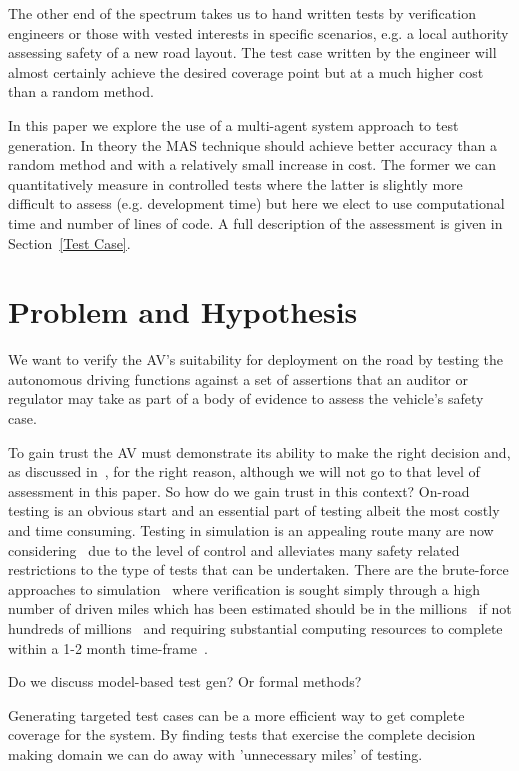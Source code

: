 \documentclass[letterpaper, 10 pt, journal, twoside]{IEEEtran}
\begin{document}
The other end of the spectrum takes us to hand written tests by verification engineers or those with vested interests in specific scenarios, e.g. a local authority assessing safety of a new road layout. The test case written by the engineer will almost certainly achieve the desired coverage point but at a much higher cost than a random method.

In this paper we explore the use of a multi-agent system approach to test generation. In theory the MAS technique should achieve better accuracy than a random method and with a relatively small increase in cost. The former we can quantitatively measure in controlled tests where the latter is slightly more difficult to assess (e.g. development time) but here we elect to use computational time and number of lines of code. A full description of the assessment is given in Section~\ref{Test Case}.


\section{Problem and Hypothesis}

We want to verify the AV's suitability for deployment on the road by testing the autonomous driving functions against a set of assertions that an auditor or regulator may take as part of a body of evidence to assess the vehicle's safety case.

To gain trust the AV must demonstrate its ability to make the right decision and, as discussed in~\cite{koopman}, for the right reason, although we will not go to that level of assessment in this paper. So how do we gain trust in this context? On-road testing is an obvious start and an essential part of testing albeit the most costly and time consuming. Testing in simulation is an appealing route many are now considering~\cite{refs} due to the level of control and alleviates many safety related restrictions to the type of tests that can be undertaken. There are the brute-force approaches to simulation~\cite{ref} where verification is sought simply through a high number of driven miles which has been estimated should be in the millions~\cite{ref} if not hundreds of millions~\cite{ref} and requiring substantial computing resources to complete within a 1-2 month time-frame~\cite{ref}.

Do we discuss model-based test gen? Or formal methods? 

Generating targeted test cases can be a more efficient way to get complete coverage for the system. By finding tests that exercise the complete decision making domain we can do away with 'unnecessary miles' of testing.
\end{document}
